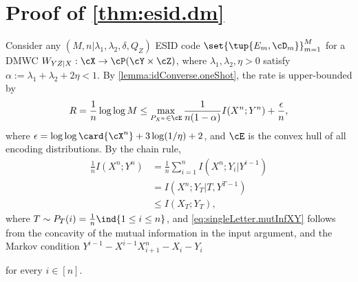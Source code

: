 \documentclass[conference,final]{IEEEtran}
\begin{document}
\section{Proof of \cref{thm:esid.dm}}
\label{sec:esid.dm.proof}

Consider any
$(M, n | \lambda_1,\lambda_2,\delta,Q_Z)$ ESID code
$\set{ \tup{E_m, \cD_m} }_{m=1}^M$
for a DMWC
$W_{YZ|X} : \cX \to \cP(\cY \times \cZ)$,
where $\lambda_1, \lambda_2, \eta > 0$
satisfy $\alpha := \lambda_1 + \lambda_2 + 2\eta < 1$.
By \cref{lemma:idConverse.oneShot}, 
the rate is upper-bounded by
\begin{gather}
  \label{eq:esid.converse.oneShot.rate}
  R = \frac{1}{n} \log\log M
  \le \max_{P_{X^n} \in \cE}
    \frac{1}{n(1-\alpha)} I(X^n; Y^n) + \frac{\epsilon}{n},
\end{gather}
where $\epsilon = \log\log \card{\cX^n} + 3\log(1/\eta) + 2$,
and $\cE$ is the convex hull of all encoding distributions.
By the chain rule,
\begin{align}
  \frac{1}{n} I(X^n; Y^n)
    & = \frac{1}{n}\sum_{i=1}^n I(X^n; Y_i | Y^{i-1})
  \\& =
  I(X^n; Y_T | T
  , Y^{T-1})
  \\& \le I(X_T; Y_T),
  \label{eq:singleLetter.mutInfXY}
\end{align}
where $T \sim P_T(i) = \frac 1 n \ind{1 \le i \le n}$,
and \cref{eq:singleLetter.mutInfXY} follows from the
concavity of the mutual information in the input argument, and the
Markov condition $Y^{i-1} - X^{i-1}X_{i+1}^n - X_i - Y_i$

for every $i \in [n]$.
\end{document}
